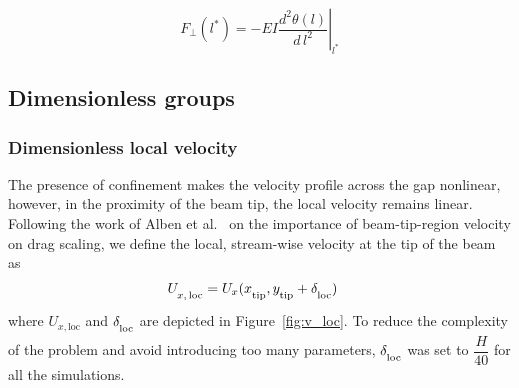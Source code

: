 \documentclass[preprint, letterpaper, nobibnotes, aps, superscriptaddress,prb]{revtex4-1}
\newcommand{\subscr}[1]{_{\mathrm{{\textstyle\mathstrut}#1}}}
\newcommand{\subscin}[2]{_{{#1},\,\mathrm{{\textstyle\mathstrut}#2}}}
\begin{document}
\begin{equation}
F_{\perp}(l^{*})=-EI\left.\frac{d^2\theta(l)}{d\,l^2}\right\vert_{l^{*}}
\end{equation}\label{lin_momentum_eq}

\iffalse
\int_0^{L}f_{_d}(l)d\,l=\int_0^{L}\frac{1}{2}\rho C_{\!_D}bU^2(l) \cos^2\theta(l)\,dl
\begin{equation}
F_{\mathrm{_{D}}}=\int_{0}^{l}\frac{1}{2}\rho\,C_{\!_D}w(U\,\cos\theta)^2
\end{equation}
Straight-beam--based $Re_{\,\mathrm{h\perp}}$, deflected-beam--based $Re_{\mathrm{\,h\angle}}$, and channel--based Reynolds numbers $Re_{\,\mathrm{H}}$ are defined as follows:

\begin{gather}
Re_{\,\mathrm{h\angle}} = \frac{\rho_{_{f}} U_{\mathrm{avg}}h}{\mu} \\[1ex]
Re_{\,\mathrm{h\perp}} = \frac{\rho_{_{f}} U(\frac{h}{2})h}{\mu} \\[1ex]
Re_{\,\mathrm{H}} = \frac{\rho_{_{f}} U_{\mathrm{top}}H}{\mu} 
\end{gather}

where $U_{\mathrm{avg}}$ is the gap-averaged velocity defined as:
\begin{align}
U_{\mathrm{avg}} &= \frac{1}{L-\mathrm{h\angle}}\int_{{\mathrm{h\angle}}}^{L}U_x(y)\,dy,
\end{align}
\fi

\subsection{Dimensionless groups}

\subsubsection{Dimensionless local velocity}
The presence of confinement makes the velocity profile across the gap nonlinear, however, in the proximity of the beam tip, the local velocity remains linear. Following the work of Alben et al.~\cite{Alben04} on the importance of beam-tip-region velocity on drag scaling, we define the local, stream-wise velocity at the tip of the beam as
\begin{align}
U\subscin{x}{loc} &= U_x(x\subscr{tip},y\subscr{tip}+\delta\subscr{loc})
\end{align}
where $U_{x,\mathrm{loc}}$ and $\delta\subscr{loc}$ are depicted in Figure~\ref{fig:v_loc}. To reduce the complexity of the problem and avoid introducing too many parameters, $\delta\subscr{loc}$ was set to $\dfrac{H}{40}$ for all the simulations.
\end{document}
